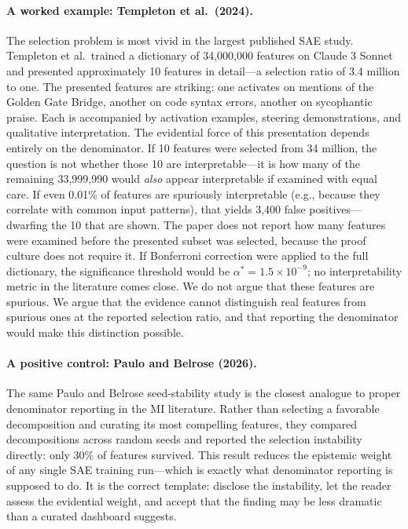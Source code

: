 \documentclass{article}
\begin{document}
\paragraph{A worked example: Templeton et al.\ (2024).} The selection problem is most vivid in the largest published SAE study. Templeton et al.\ trained a dictionary of 34,000,000 features on Claude 3 Sonnet and presented approximately 10 features in detail---a selection ratio of 3.4 million to one. The presented features are striking: one activates on mentions of the Golden Gate Bridge, another on code syntax errors, another on sycophantic praise. Each is accompanied by activation examples, steering demonstrations, and qualitative interpretation. The evidential force of this presentation depends entirely on the denominator. If 10 features were selected from 34 million, the question is not whether those 10 are interpretable---it is how many of the remaining 33,999,990 would \textit{also} appear interpretable if examined with equal care. If even 0.01\% of features are spuriously interpretable (e.g., because they correlate with common input patterns), that yields 3,400 false positives---dwarfing the 10 that are shown. The paper does not report how many features were examined before the presented subset was selected, because the proof culture does not require it. If Bonferroni correction were applied to the full dictionary, the significance threshold would be $\alpha^* = 1.5 \times 10^{-9}$; no interpretability metric in the literature comes close. We do not argue that these features are spurious. We argue that the evidence cannot distinguish real features from spurious ones at the reported selection ratio, and that reporting the denominator would make this distinction possible.

\paragraph{A positive control: Paulo and Belrose (2026).} The same Paulo and Belrose seed-stability study is the closest analogue to proper denominator reporting in the MI literature. Rather than selecting a favorable decomposition and curating its most compelling features, they compared decompositions across random seeds and reported the selection instability directly: only 30\% of features survived. This result reduces the epistemic weight of any single SAE training run---which is exactly what denominator reporting is supposed to do. It is the correct template: disclose the instability, let the reader assess the evidential weight, and accept that the finding may be less dramatic than a curated dashboard suggests.
\end{document}
